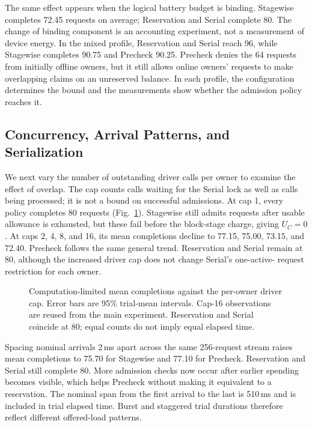 The same effect appears when the logical battery budget is binding.
Stagewise completes 72.45 requests on average; Reservation and Serial
complete 80. The change of binding component is an accounting experiment,
not a measurement of device energy. In the mixed profile, Reservation and
Serial reach 96, while Stagewise completes 90.75 and Precheck 90.25.
Precheck denies the 64 requests from initially offline owners, but it still
allows online owners' requests to make overlapping claims on an unreserved
balance. In each profile, the configuration determines the bound and the
measurements show whether the admission policy reaches it.

\subsection{Concurrency, Arrival Patterns, and Serialization}

We next vary the number of outstanding driver calls per owner to examine
the effect of overlap. The cap counts calls waiting for the Serial lock as
well as calls being processed; it is not a bound on successful admissions.
At cap 1, every policy completes 80 requests (Fig.~\ref{fig:concurrency}).
Stagewise still admits requests after usable allowance is exhausted, but
these fail before the block-stage charge, giving $U_C=0$. At caps 2, 4, 8,
and 16, its mean completions decline to 77.15, 75.00, 73.15, and 72.40.
Precheck follows the same general trend. Reservation and Serial remain at
80, although the increased driver cap does not change Serial's one-active-
request restriction for each owner.

\begin{figure}[t]
\centering

\caption{Computation-limited mean completions against the per-owner driver cap.
Error bars are 95\% trial-mean intervals. Cap-16 observations are reused from the
main experiment. Reservation and Serial coincide at 80; equal counts do not
imply equal elapsed time.}
\label{fig:concurrency}
\end{figure}

Spacing nominal arrivals 2\,ms apart across the same 256-request stream
raises mean completions to 75.70 for Stagewise and 77.10 for Precheck.
Reservation and Serial still complete 80. More admission checks now occur
after earlier spending becomes visible, which helps Precheck without making
it equivalent to a reservation. The nominal span from the first arrival to
the last is 510\,ms and is included in trial elapsed time. Burst and
staggered trial durations therefore reflect different offered-load patterns.

